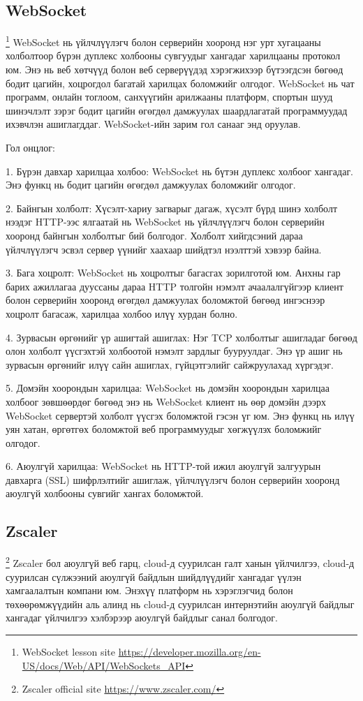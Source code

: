 \subsection{WebSocket}
			\footnote{WebSocket lesson site \url{https://developer.mozilla.org/en-US/docs/Web/API/WebSockets_API}}
				\quad \quad WebSocket нь үйлчлүүлэгч болон серверийн хооронд нэг урт хугацааны холболтоор бүрэн дуплекс холбооны сувгуудыг хангадаг харилцааны протокол юм. Энэ нь веб хөтчүүд болон веб серверүүдэд хэрэгжихээр бүтээгдсэн бөгөөд бодит цагийн, хоцрогдол багатай харилцах боломжийг олгодог. WebSocket нь чат программ, онлайн тоглоом, санхүүгийн арилжааны платформ, спортын шууд шинэчлэлт зэрэг бодит цагийн өгөгдөл дамжуулах шаардлагатай программуудад ихэвчлэн ашиглагддаг. WebSocket-ийн зарим гол санааг энд оруулав.

				Гол онцлог:
				
				1. Бүрэн давхар харилцаа холбоо: WebSocket нь бүтэн дуплекс холбоог хангадаг. Энэ функц нь бодит цагийн өгөгдөл дамжуулах боломжийг олгодог.
				
				2. Байнгын холболт: Хүсэлт-хариу загварыг дагаж, хүсэлт бүрд шинэ холболт нээдэг HTTP-ээс ялгаатай нь WebSocket нь үйлчлүүлэгч болон серверийн хооронд байнгын холболтыг бий болгодог. Холболт хийгдсэний дараа үйлчлүүлэгч эсвэл сервер үүнийг хаахаар шийдтэл нээлттэй хэвээр байна.
				
				3. Бага хоцролт: WebSocket нь хоцролтыг багасгах зорилготой юм. Анхны гар барих ажиллагаа дууссаны дараа HTTP толгойн нэмэлт ачаалалгүйгээр клиент болон серверийн хооронд өгөгдөл дамжуулах боломжтой бөгөөд ингэснээр хоцролт багасаж, харилцаа холбоо илүү хурдан болно.
				
				4. Зурвасын өргөнийг үр ашигтай ашиглах: Нэг TCP холболтыг ашигладаг бөгөөд олон холболт үүсгэхтэй холбоотой нэмэлт зардлыг бууруулдаг. Энэ үр ашиг нь зурвасын өргөнийг илүү сайн ашиглах, гүйцэтгэлийг сайжруулахад хүргэдэг.
				
				5. Домэйн хоорондын харилцаа: WebSocket нь домэйн хоорондын харилцаа холбоог зөвшөөрдөг бөгөөд энэ нь WebSocket клиент нь өөр домэйн дээрх WebSocket сервертэй холболт үүсгэх боломжтой гэсэн үг юм. Энэ функц нь илүү уян хатан, өргөтгөх боломжтой веб программуудыг хөгжүүлэх боломжийг олгодог.
				
				6. Аюулгүй харилцаа: WebSocket нь HTTP-той ижил аюулгүй залгуурын давхарга (SSL) шифрлэлтийг ашиглаж, үйлчлүүлэгч болон серверийн хооронд аюулгүй холбооны сувгийг хангах боломжтой.		

\subsection{Zscaler}
				\footnote{Zscaler official site \url{https://www.zscaler.com/}}
					\quad \quad Zscaler бол аюулгүй веб гарц, cloud-д суурилсан галт ханын үйлчилгээ, cloud-д суурилсан сүлжээний аюулгүй байдлын шийдлүүдийг хангадаг үүлэн хамгаалалтын компани юм. Энэхүү платформ нь хэрэглэгчид болон төхөөрөмжүүдийн аль алинд нь cloud-д суурилсан интернэтийн аюулгүй байдлыг хангадаг үйлчилгээ хэлбэрээр аюулгүй байдлыг санал болгодог.

